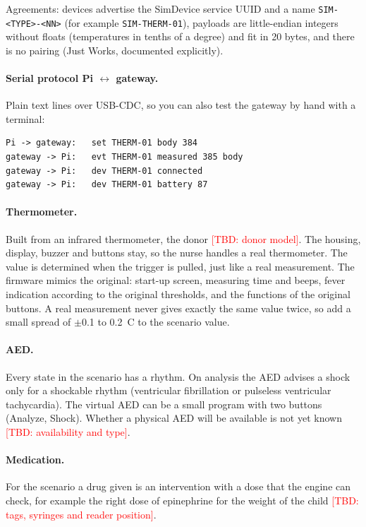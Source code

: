 \documentclass[11pt,a4paper]{article}
\newcommand{\tbd}[1]{\textcolor{red}{[TBD: #1]}}
\begin{document}
Agreements: devices advertise the SimDevice service UUID and a name
\texttt{SIM-<TYPE>-<NN>} (for example \texttt{SIM-THERM-01}), payloads are
little-endian integers without floats (temperatures in tenths of a degree) and
fit in 20 bytes, and there is no pairing (Just Works, documented explicitly).

\paragraph{Serial protocol Pi $\leftrightarrow$ gateway.} Plain text lines
over USB-CDC, so you can also test the gateway by hand with a terminal:
\begin{lstlisting}[basicstyle=\ttfamily\footnotesize,columns=fullflexible]
Pi -> gateway:   set THERM-01 body 384
gateway -> Pi:   evt THERM-01 measured 385 body
gateway -> Pi:   dev THERM-01 connected
gateway -> Pi:   dev THERM-01 battery 87
\end{lstlisting}

\paragraph{Thermometer.} Built from an infrared thermometer, the donor
\tbd{donor model}. The housing, display, buzzer and buttons stay, so the nurse
handles a real thermometer. The value is determined when the trigger is pulled,
just like a real measurement. The firmware mimics the original: start-up
screen, measuring time and beeps, fever indication according to the original
thresholds, and the functions of the original buttons. A real measurement never
gives exactly the same value twice, so add a small spread of $\pm$0.1 to
0.2~\textdegree C to the scenario value.

\paragraph{AED.} Every state in the scenario has a rhythm. On analysis the AED
advises a shock only for a shockable rhythm (ventricular fibrillation or
pulseless ventricular tachycardia). The virtual AED can be a small program with
two buttons (Analyze, Shock). Whether a physical AED will be available is not
yet known \tbd{availability and type}.

\paragraph{Medication.} For the scenario a drug given is an intervention with a
dose that the engine can check, for example the right dose of epinephrine for
the weight of the child \tbd{tags, syringes and reader position}.
\end{document}
